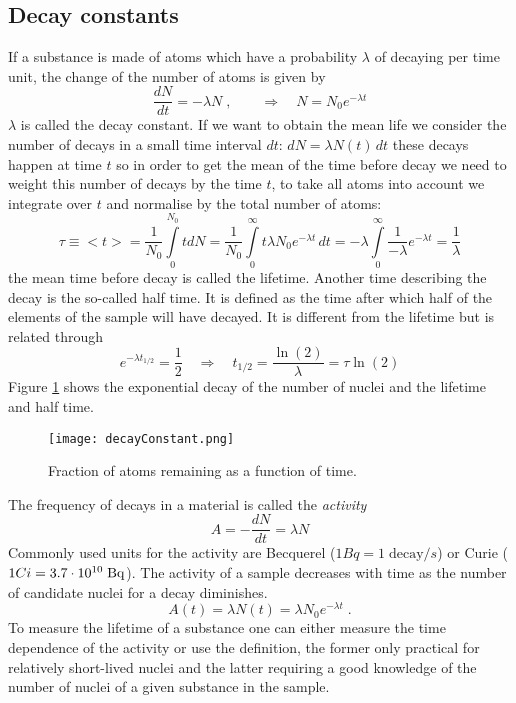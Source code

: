 \subsection{Decay constants}
If a substance is made of atoms which have a probability $\lambda$ of decaying per time unit, the change of the number of atoms is given by
\[\frac{dN}{dt}=-\lambda N\;,\qquad\Rightarrow \quad N=N_0 e^{-\lambda t}\]
$\lambda$ is called the decay constant. If we want to obtain the mean life we consider the number of decays in a small time interval $dt$: $dN=\lambda N(t)\,dt$ these decays happen at time $t$ so in order to get the mean of the time before decay we need to weight this number of decays by the time $t$, to take all atoms into account we integrate over $t$ and normalise by the total number of atoms:
\[\tau\equiv<t>=\frac{1}{N_0}\int\limits_{0}^{N_0} t dN =\frac{1}{N_0}\int\limits_0^\infty t \lambda N_0 e^{-\lambda t}\,dt=-\lambda\int\limits_0^\infty\frac{1}{-\lambda}e^{-\lambda t}=\frac{1}{\lambda}\]
the mean time before decay is called the lifetime. Another time describing the decay is the so-called half time. It is defined as the time after which half of the elements of the sample will have decayed. It is different from the lifetime but is related through
\[e^{-\lambda t_{1/2}}=\frac12 \quad\Rightarrow \quad t_{1/2}=\frac{\ln(2)}{\lambda}=\tau \ln(2)\]
Figure \ref{fig:decayConstant} shows the exponential decay of the number of nuclei and the lifetime and half time.
\begin{figure}
\begin{center}
\texttt{[image: decayConstant.png]}
\caption{Fraction of atoms remaining as a function of time.}\label{fig:decayConstant}
\end{center}
\end{figure}
The frequency of decays in a material is called the \emph{activity}
\[A=-\frac{dN}{dt}=\lambda N\]
Commonly used units for the activity are Becquerel ($1 Bq=1\;\mbox{decay}/s$) or Curie ($1 Ci=3.7\cdot 10^{10}\;\rm Bq$). The activity of a sample decreases with time as the number of candidate nuclei for a decay diminishes.
\[A(t)=\lambda N(t)=\lambda N_0 e^{-\lambda t}\;.\]
To measure the lifetime of a substance one can either measure the time dependence of the activity or use the definition, the former only practical for relatively short-lived nuclei and the latter requiring a good knowledge of the number of nuclei of a given substance in the sample.

